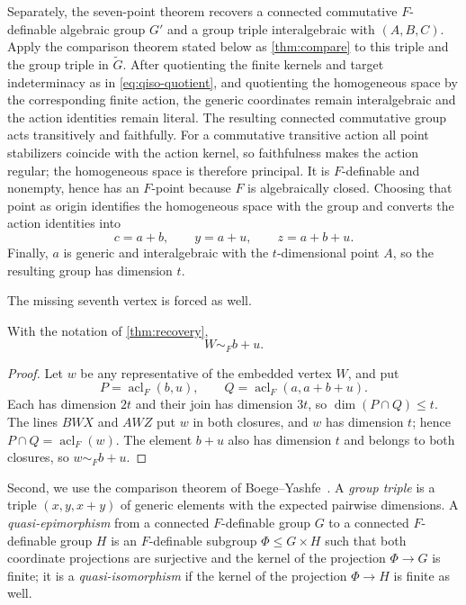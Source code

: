 \documentclass[11pt]{article}
\theoremstyle{definition}
\newcommand{\acl}{\operatorname{acl}}
\newcommand{\simF}{\mathrel{\sim_F}}
\begin{document}
Separately, the seven-point theorem recovers a connected commutative $F$-definable algebraic group $G'$ and a group triple interalgebraic with $(A,B,C)$.  Apply the comparison theorem stated below as \cref{thm:compare} to this triple and the group triple in $\widetilde G$.  After quotienting the finite kernels and target indeterminacy as in \eqref{eq:qiso-quotient}, and quotienting the homogeneous space by the corresponding finite action, the generic coordinates remain interalgebraic and the action identities remain literal.  The resulting connected commutative group acts transitively and faithfully.  For a commutative transitive action all point stabilizers coincide with the action kernel, so faithfulness makes the action regular; the homogeneous space is therefore principal.  It is $F$-definable and nonempty, hence has an $F$-point because $F$ is algebraically closed.  Choosing that point as origin identifies the homogeneous space with the group and converts the action identities into
\[
c=a+b,\qquad y=a+u,\qquad z=a+b+u.
\]
Finally, $a$ is generic and interalgebraic with the $t$-dimensional point $A$, so the resulting group has dimension $t$.

The missing seventh vertex is forced as well.

\begin{lemma}\label{lem:cube}
With the notation of \cref{thm:recovery},
\[
W\simF b+u.
\]
\end{lemma}
\begin{proof}
Let $w$ be any representative of the embedded vertex $W$, and put
\[
P=\acl_F(b,u),\qquad Q=\acl_F(a,a+b+u).
\]
Each has dimension $2t$ and their join has dimension $3t$, so $\dim(P\cap Q)\le t$.  The lines $BWX$ and $AWZ$ put $w$ in both closures, and $w$ has dimension $t$; hence $P\cap Q=\acl_F(w)$.  The element $b+u$ also has dimension $t$ and belongs to both closures, so $w\simF b+u$.
\end{proof}

Second, we use the comparison theorem of Boege--Yashfe~\cite[Theorem~3.14]{BoegeYashfe2026}.  A \emph{group triple} is a triple $(x,y,x+y)$ of generic elements with the expected pairwise dimensions.  A \emph{quasi-epimorphism} from a connected $F$-definable group $G$ to a connected $F$-definable group $H$ is an $F$-definable subgroup $\Phi\le G\times H$ such that both coordinate projections are surjective and the kernel of the projection $\Phi\to G$ is finite; it is a \emph{quasi-isomorphism} if the kernel of the projection $\Phi\to H$ is finite as well.
\end{document}
